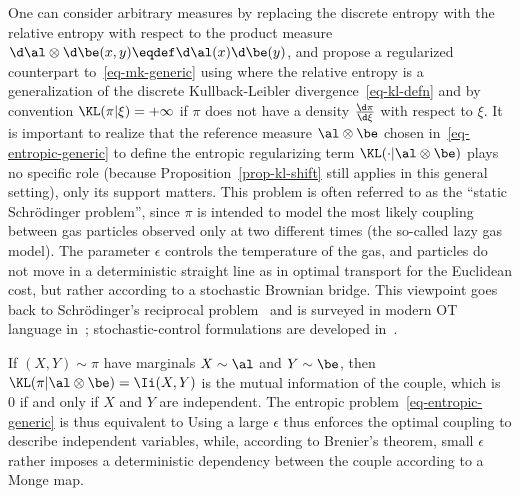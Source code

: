 One can consider arbitrary measures by replacing the discrete entropy with the relative entropy with respect to the product measure $\d\al\otimes\d\be(x,y) \eqdef \d\al(x)\d\be(y)$, and propose a regularized counterpart to~\eqref{eq-mk-generic} using
where the relative entropy is a generalization of the discrete Kullback-Leibler divergence~\eqref{eq-kl-defn}
and by convention $\KL(\pi|\xi)=+\infty$ if $\pi$ does not have a density $\frac{\d \pi}{\d\xi}$ with respect to $\xi$.
%
It is important to realize that the reference measure $\al\otimes\be$ chosen in~\eqref{eq-entropic-generic} to define the entropic regularizing term $\KL(\cdot|\al\otimes\be)$ plays no specific role (because Proposition~\ref{prop-kl-shift} still applies in this general setting), only its support matters.
%
This problem is often referred to as the ``static Schr\"odinger problem'', since $\pi$ is intended to model the most likely coupling between gas particles observed only at two different times (the so-called lazy gas model). The parameter $\epsilon$ controls the temperature of the gas, and particles do not move in a deterministic straight line as in optimal transport for the Euclidean cost, but rather according to a stochastic Brownian bridge. This viewpoint goes back to Schr\"odinger's reciprocal problem~\cite{Schroedinger31} and is surveyed in modern OT language in~\cite{leonard2012schrodinger,LeonardSchroedinger}; stochastic-control formulations are developed in~\cite{chen2016relation}.

\begin{rem}
	If $(X,Y) \sim \pi$ have marginals $X \sim \al$ and $Y \sim \be$, then $\KL(\pi|\al \otimes \be) = \Ii(X,Y)$ is the mutual information of the couple, which is 0 if and only if $X$ and $Y$ are independent. The entropic problem~\eqref{eq-entropic-generic} is thus equivalent to
	Using a large $\epsilon$ thus enforces the optimal coupling to describe independent variables, while, according to Brenier's theorem, small $\epsilon$ rather imposes a deterministic dependency between the couple according to a Monge map.
\end{rem}


